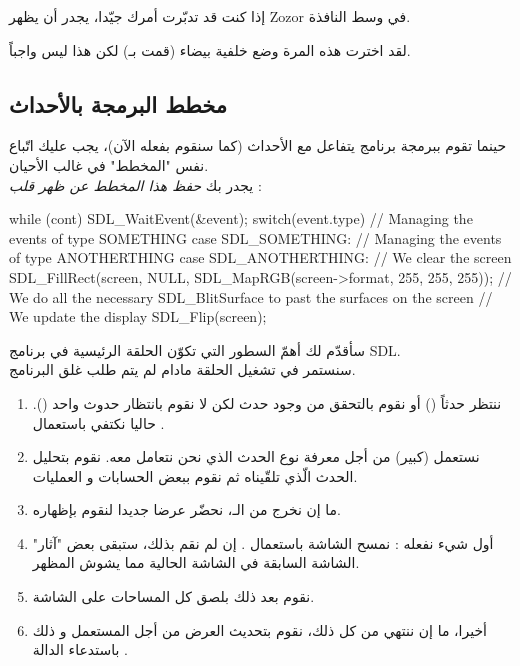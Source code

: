 إذا كنت قد تدبّرت أمرك جيّدا، يجدر أن يظهر 
\textenglish{Zozor}
في وسط النافذة.


لقد اخترت هذه المرة وضع خلفية بيضاء (قمت بـ)
لكن هذا ليس واجباً.

\subsection{مخطط البرمجة بالأحداث}

حينما تقوم ببرمجة برنامج يتفاعل مع الأحداث (كما سنقوم بفعله الآن)، يجب عليك اتّباع نفس "المخطط" في غالب الأحيان.\\
يجدر بك 
\textit{حفظ هذا المخطط عن ظهر قلب} :

\begin{Csource}
while (cont)
{
	SDL_WaitEvent(&event);
	switch(event.type)
	{
		// Managing the events of type SOMETHING
		case SDL_SOMETHING:
		// Managing the events of type ANOTHERTHING
		case SDL_ANOTHERTHING:
	}
	// We clear the screen
	SDL_FillRect(screen, NULL, SDL_MapRGB(screen->format, 255, 255, 255)); 
	// We do all the necessary SDL_BlitSurface to past the surfaces on the screen
	// We update the display
	SDL_Flip(screen);
}
\end{Csource}

سأقدّم لك أهمّ السطور التي تكوّن الحلقة الرئيسية في برنامج 
\textenglish{SDL}.\\
سنستمر في تشغيل الحلقة مادام لم يتم طلب غلق البرنامج.

\begin{enumerate}
	\item ننتظر حدثاً
	()
	أو نقوم بالتحقق من وجود حدث لكن لا نقوم بانتظار حدوث واحد 
	().
	حاليا نكتفي باستعمال 
	.
	\item نستعمل 
	(كبير) من أجل معرفة نوع الحدث الذي نحن نتعامل معه. نقوم بتحليل الحدث الّذي تلقّيناه ثم نقوم ببعض الحسابات و العمليات.
	\item ما إن نخرج من الـ،
	نحضّر عرضا جديدا لنقوم بإظهاره.
	\item أول شيء نفعله : نمسح الشاشة باستعمال
	.
	إن لم نقم بذلك، ستبقى بعض "آثار" الشاشة السابقة في الشاشة الحالية مما يشوش المظهر.
	\item نقوم بعد ذلك بلصق كل المساحات على الشاشة.
	\item أخيرا، ما إن ننتهي من كل ذلك، نقوم بتحديث العرض من أجل المستعمل و ذلك باستدعاء الدالة
	.
\end{enumerate}

